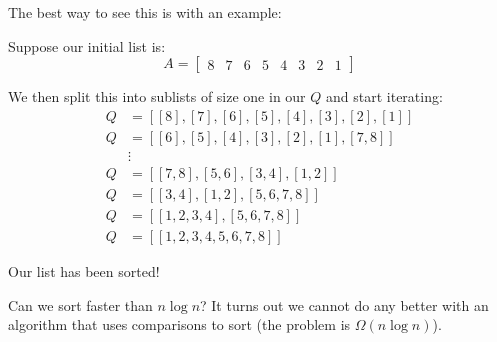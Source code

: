 The best way to see this is with an example:

\begin{example}
    Suppose our initial list is:
    \[ A = \begin{bmatrix}
        8 & 7 & 6 & 5 & 4 & 3 & 2 & 1
    \end{bmatrix} \]

    We then split this into sublists of size one in our $Q$ and start iterating:
    \begin{align*}
        Q &= [
            [8], [7], [6], [5], [4], [3], [2], [1]
        ] \\
        Q &= [
            [6], [5], [4], [3], [2], [1], [7, 8]
        ] \\
        &\vdots \\
        Q &= [
            [7, 8] , [5, 6] , [3, 4] , [1, 2]
        ] \\
        Q &= [[3, 4] , [1, 2] , [5, 6, 7, 8]] \\
        Q &= [[1, 2, 3, 4] , [5, 6, 7, 8]] \\
        Q &= [[1, 2, 3, 4, 5, 6, 7, 8]] 
    \end{align*}

    Our list has been sorted!
\end{example}

Can we sort faster than $n \log n$? It turns out we cannot do any better with an algorithm that uses comparisons to
sort (the problem is $\Omega(n \log n)$).

